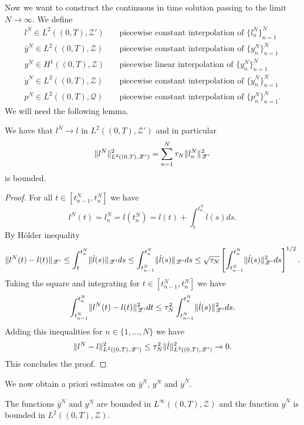 Now we want to construct the continuous in time solution passing to the limit $N\to\infty$. We define
\begin{align*}
l^N\in L^2((0,T),\mathscr{Z}')\quad&\text{piecewise constant interpolation of $\{l_n^N\}_{n=1}^N$} \\
\bar{y}^N\in L^2((0,T),\mathscr{Z})\quad&\text{piecewise constant interpolation of $\{y_n^N\}_{n=1}^N$} \\
y^N\in H^1((0,T),\mathscr{Z})\quad&\text{piecewise linear interpolation of $\{y_n^N\}_{n=1}^N$} \\
\dot y^N\in L^2((0,T),\mathscr{Z})\quad&\text{piecewise constant interpolation of $\{\dot y_n^N\}_{n=1}^N$} \\
p^N\in L^2((0,T),\mathscr{Q})\quad&\text{piecewise constant interpolation of $\{p_n^N\}_{n=1}^N$}.
\end{align*}
We will need the following lemma.
\begin{lemma}
\label{lemma:convergence-l}
We have that $l^N\to l$ in $L^2((0,T),\mathscr{Z}')$ and in particular
\[
\lVert l^N\rVert_{L^2((0,T),\mathscr{Z}')}^2=\sum_{n=1}^{N}\tau_N\lVert l_n^N\rVert_{\mathscr{Z}'}^2
\]
is bounded.
\end{lemma}
\begin{proof}
For all $t\in[t_{n-1}^N,t_n^N]$ we have
\[
l^N(t)=l_n^N=l(t_n^N)=l(t)+\int_t^{t_n^N}\dot l(s)ds.
\]
By H\"older inequality
\[
\lVert l^N(t)-l(t)\rVert_{\mathscr{Z}'}\le\int_t^{t_n^N}\lVert\dot l(s)\rVert_{\mathscr{Z}'}ds\le\int_{t_{n-1}^N}^{t_n^N}\lVert\dot l(s)\rVert_{\mathscr{Z}'}ds\le\sqrt{\tau_N}\left[\int_{t_{n-1}^N}^{t_n^N}\lVert\dot l(s)\rVert_{\mathscr{Z}'}^2ds\right]^{1/2}.
\]
Taking the square and integrating for $t\in[t_{n-1}^N,t_n^N]$ we have
\[
\int_{t_{n-1}^N}^{t_n^N}\lVert l^N(t)-l(t)\rVert_{\mathscr{Z}'}^2dt\le\tau_N^2\int_{t_{n-1}^N}^{t_n^N}\lVert\dot l(s)\rVert_{\mathscr{Z}'}^2ds.
\]
Adding this inequalities for $n\in\{1,\dots,N\}$ we have
\[
\lVert l^N-l\rVert_{L^2((0,T),\mathscr{Z}')}^2\le\tau_N^2\lVert\dot l\rVert_{L^2((0,T),\mathscr{Z}')}^2\to0.
\]
This concludes the proof.
\end{proof}
We now obtain a priori estimates on $\bar y^N$, $y^N$ and $\dot y^N$.
\begin{lemma}
The functions $\bar y^N$ and $y^N$ are bounded in $L^\infty((0,T),\mathscr{Z})$ and the function $\dot y^N$ is bounded in $L^2((0,T),\mathscr{Z})$.
\end{lemma}
